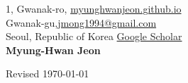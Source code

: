 \documentclass{cv} %
\begin{document}
1, Gwanak-ro,  \hfill \href{https://myunghwanjeon.github.io/}{myunghwanjeon.github.io}\\
Gwanak-gu,\hfill \href{mailto:jmong1994@gmail.com}{jmong1994@gmail.com}\\
Seoul, Republic of Korea \hfill \href{https://scholar.google.com/citations?user=ivOqySYAAAAJ}{Google Scholar} \\

\hfil{\namesize\bf Myung-Hwan Jeon}\hfil

\vspace{-3mm}



% 

\clearpage



% 




\vspace{0.5in}
\hfill Revised \today
\end{document}
